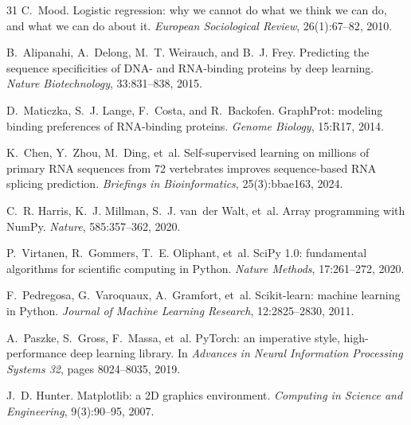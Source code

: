 \begin{thebibliography}{31}
C.~Mood.
\newblock Logistic regression: why we cannot do what we think we can do, and what we can do about
it.
\newblock \emph{European Sociological Review}, 26(1):67--82, 2010.
\newblock {}

B.~Alipanahi, A.~Delong, M.~T. Weirauch, and B.~J. Frey.
\newblock Predicting the sequence specificities of DNA- and RNA-binding proteins by deep
learning.
\newblock \emph{Nature Biotechnology}, 33:831--838, 2015.
\newblock {}

D.~Maticzka, S.~J. Lange, F.~Costa, and R.~Backofen.
\newblock GraphProt: modeling binding preferences of RNA-binding proteins.
\newblock \emph{Genome Biology}, 15:R17, 2014.
\newblock {}

K.~Chen, Y.~Zhou, M.~Ding, et~al.
\newblock Self-supervised learning on millions of primary RNA sequences from 72 vertebrates
improves sequence-based RNA splicing prediction.
\newblock \emph{Briefings in Bioinformatics}, 25(3):bbae163, 2024.
\newblock {}

C.~R. Harris, K.~J. Millman, S.~J. van~der Walt, et~al.
\newblock Array programming with NumPy.
\newblock \emph{Nature}, 585:357--362, 2020.
\newblock {}

P.~Virtanen, R.~Gommers, T.~E. Oliphant, et~al.
\newblock SciPy 1.0: fundamental algorithms for scientific computing in Python.
\newblock \emph{Nature Methods}, 17:261--272, 2020.
\newblock {}

F.~Pedregosa, G.~Varoquaux, A.~Gramfort, et~al.
\newblock Scikit-learn: machine learning in Python.
\newblock \emph{Journal of Machine Learning Research}, 12:2825--2830, 2011.

A.~Paszke, S.~Gross, F.~Massa, et~al.
\newblock PyTorch: an imperative style, high-performance deep learning library.
\newblock In \emph{Advances in Neural Information Processing Systems 32}, pages 8024--8035, 2019.

J.~D. Hunter.
\newblock Matplotlib: a 2D graphics environment.
\newblock \emph{Computing in Science and Engineering}, 9(3):90--95, 2007.
\newblock {}


\end{thebibliography}
